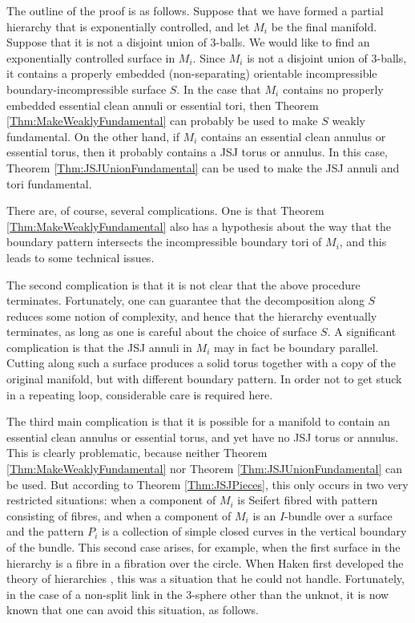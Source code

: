 \documentclass[oneside]{amsart}
\numberwithin{equation}{section}
\theoremstyle{plain}
\theoremstyle{definition}
\begin{document}
The outline of the proof is as follows. Suppose that we have formed a partial hierarchy that is
exponentially controlled, and let $M_i$ be the final manifold. Suppose that it is not a disjoint union of 3-balls.
We would like to find an exponentially controlled surface in $M_i$. Since $M_i$ is not a disjoint union of 3-balls,
it contains a properly embedded (non-separating) orientable incompressible boundary-incompressible surface $S$.
In the case that $M_i$ contains no properly embedded essential clean annuli
or essential tori, then Theorem \ref{Thm:MakeWeaklyFundamental} can probably be used to make $S$ weakly fundamental. 
On the other hand, if $M_i$ contains an essential clean annulus or essential torus, then it probably contains a JSJ torus or annulus.
In this case, Theorem \ref{Thm:JSJUnionFundamental} can be used to make the JSJ annuli and tori fundamental. 

There are, of course, several complications. One is that Theorem \ref{Thm:MakeWeaklyFundamental} 
also has a hypothesis about the way that the boundary pattern intersects the incompressible boundary tori of $M_i$, and this leads to
some technical issues. 

The second complication is that it is not clear that the above procedure terminates.
Fortunately, one can guarantee that the decomposition along $S$ reduces some notion of complexity, and hence
that the hierarchy eventually terminates, as long as one is careful about the choice of surface $S$.
A significant complication is that the JSJ annuli in $M_i$ may in fact be boundary parallel.
Cutting along such a surface produces a solid torus together with a copy of the original manifold,
but with different boundary pattern. In order not to get stuck in a repeating loop, considerable
care is required here.

The third main complication is that it is possible for a manifold to contain an essential clean annulus or essential torus,
and yet have no JSJ torus or annulus. This is clearly problematic, because neither 
Theorem \ref{Thm:MakeWeaklyFundamental} nor Theorem \ref{Thm:JSJUnionFundamental} can be used.
But according to Theorem \ref{Thm:JSJPieces}, this only occurs in two very restricted situations:
when a component of $M_i$ is Seifert fibred with pattern consisting of fibres, and when a component of $M_i$ 
is an $I$-bundle over a surface and the pattern $P_i$ is a collection of simple closed curves
in the vertical boundary of the bundle. 
This second case arises, for example, when the first surface in the hierarchy is a fibre in a fibration over the
circle. When Haken first developed the theory of hierarchies \cite{Haken}, this was a situation that he could
not handle. Fortunately, in the case of a non-split link in the 3-sphere other than the unknot, it is now known that one
can avoid this situation, as follows.
\end{document}
